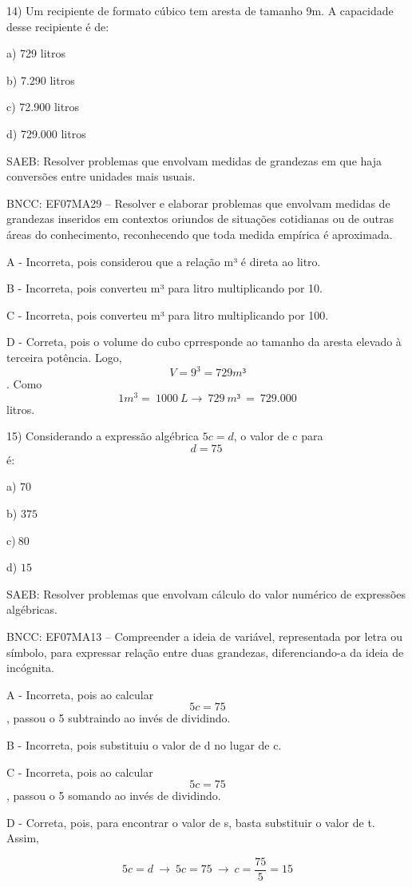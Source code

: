 14) Um recipiente de formato cúbico tem aresta de tamanho 9m. A
capacidade desse recipiente é de:

a) 729 litros

b) 7.290 litros

c) 72.900 litros

d) 729.000 litros

SAEB: Resolver problemas que envolvam medidas de grandezas em que haja
conversões entre unidades mais usuais.

BNCC: EF07MA29 -- Resolver e elaborar problemas que envolvam medidas de
grandezas inseridos em contextos oriundos de situações cotidianas ou de
outras áreas do conhecimento, reconhecendo que toda medida empírica é
aproximada.

A - Incorreta, pois considerou que a relação m³ é direta ao litro.

B - Incorreta, pois converteu m³ para litro multiplicando por 10.

C - Incorreta, pois converteu m³ para litro multiplicando por 100.

D - Correta, pois o volume do cubo cprresponde ao tamanho da aresta
elevado à terceira potência. Logo, \[V = 9^{3} = 729m³\] . Como
\[1m^{3} = \ 1000\ L \rightarrow \ 729\ m³\  = \ 729.000\] litros.

15) Considerando a expressão algébrica \(5c = d\), o valor de c para
\[d = 75\ \]é:

a) \(70\)

b) \(375\)

c)\(\ 80\)

d) \(15\)

SAEB: Resolver problemas que envolvam cálculo do valor numérico de
expressões algébricas.

BNCC: EF07MA13 -- Compreender a ideia de variável, representada por
letra ou símbolo, para expressar relação entre duas grandezas,
diferenciando-a da ideia de incógnita.

A - Incorreta, pois ao calcular \[5c = 75\], passou o 5 subtraindo ao
invés de dividindo.

B - Incorreta, pois substituiu o valor de d no lugar de c.

C - Incorreta, pois ao calcular \[5c = 75\], passou o 5 somando ao invés
de dividindo.

D - Correta, pois, para encontrar o valor de s, basta substituir o valor
de t. Assim,

\[5c = d\  \rightarrow \ 5c = 75\  \rightarrow \ c = \frac{75}{5} = 15\]

